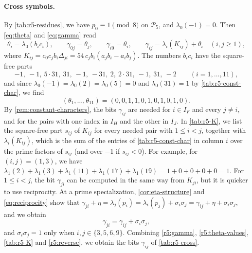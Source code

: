 \documentclass[12pt,oneside,openany]{book}
\theoremstyle{definition}
\theoremstyle{plain}
\numberwithin{equation}{chapter}
\theoremstyle{plain}
\theoremstyle{definition}
\theoremstyle{remark}
\newcommand{\cP}{\mathcal P}
\begin{document}
\paragraph{Cross symbols.} By \cref{tab:r5-residues}, we have $p_0\equiv1\pmod8$ on $\cP_5$, and $\lambda_0(-1)=0$. Then \eqref{eq:theta} and \eqref{eq:gamma} read
\begin{equation}\label{r5:gamma}
\theta_i=\lambda_0(b_ic_i),\qquad \gamma_{0j}=\theta_j,\qquad \gamma_{i0}=\theta_i,\qquad \gamma_{ij}=\lambda_i(K_{ij})+\theta_i\quad(i,j\ge1),
\end{equation}
where $K_{ij}=c_0c_jb_i\Delta_{ji}=54\,c_jb_i(a_jb_i-a_ib_j)$. The numbers $b_ic_i$ have the square-free parts
\[
-1,\ -1,\ 5\cdot31,\ 31,\ -1,\ -31,\ 2,\ 2\cdot31,\ -1,\ 31,\ -2\qquad(i=1,\dots,11),
\]
and since $\lambda_0(-1)=\lambda_0(2)=\lambda_0(5)=0$ and $\lambda_0(31)=1$ by \cref{tab:r5-const-char}, we find
\begin{equation}\label{r5:theta-values}
(\theta_1,\dots,\theta_{11})=(0,0,1,1,0,1,0,1,0,1,0).
\end{equation}
By \cref{rem:constant-characters}, the bits $\gamma_{ij}$ are needed for $i\in I_F$ and every $j\ne i$, and for the pairs with one index in $I_H$ and the other in $I_J$. In \cref{tab:r5-K}, we list the square-free part $s_{ij}$ of $K_{ij}$ for every needed pair with $1\le i<j$, together with $\lambda_i(K_{ij})$, which is the sum of the entries of \cref{tab:r5-const-char} in column $i$ over the prime factors of $s_{ij}$ (and over $-1$ if $s_{ij}<0$). For example, for $(i,j)=(1,3)$, we have $\lambda_1(2)+\lambda_1(3)+\lambda_1(11)+\lambda_1(17)+\lambda_1(19)=1+0+0+0+0=1$. For $1\le i<j$, the bit $\gamma_{ji}$ can be computed in the same way from $K_{ji}$, but it is quicker to use reciprocity. At a prime specialization, \cref{cor:eta-structure} and \eqref{eq:reciprocity} show that $\gamma_{ji}+\eta=\lambda_j(p_i)=\lambda_i(p_j)+\sigma_i\sigma_j=\gamma_{ij}+\eta+\sigma_i\sigma_j$, and we obtain
\begin{equation}\label{r5:reverse}
\gamma_{ji}=\gamma_{ij}+\sigma_i\sigma_j,
\end{equation}
and $\sigma_i\sigma_j=1$ only when $i,j\in\{3,5,6,9\}$. Combining \eqref{r5:gamma}, \eqref{r5:theta-values}, \cref{tab:r5-K} and \eqref{r5:reverse}, we obtain the bits $\gamma_{ij}$ of \cref{tab:r5-cross}.
\end{document}
